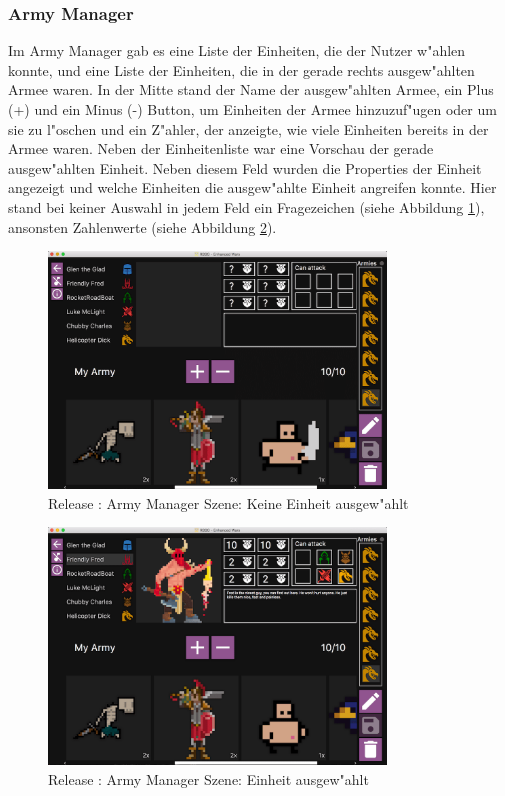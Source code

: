 \documentclass[12pt, titlepage]{scrartcl}
\newcommand{\RN}[1]{%
	\textup{\uppercase\expandafter{\romannumeral#1}}%
}
\begin{document}
		    \subsubsection{Army Manager}
		        Im Army Manager gab es eine Liste der Einheiten, die der Nutzer w"ahlen konnte, und eine Liste der Einheiten, die in der gerade rechts ausgew"ahlten Armee waren. In der Mitte stand der Name der ausgew"ahlten Armee, ein Plus (+) und ein Minus (-) Button, um Einheiten der Armee hinzuzuf"ugen oder um sie zu l"oschen und ein Z"ahler, der anzeigte, wie viele Einheiten bereits in der Armee waren. Neben der Einheitenliste war eine Vorschau der gerade ausgew"ahlten Einheit. Neben diesem Feld wurden die Properties der Einheit angezeigt und welche Einheiten die ausgew"ahlte Einheit angreifen konnte. Hier stand bei keiner Auswahl in jedem Feld ein Fragezeichen (siehe Abbildung \ref{Army_Manager_No_Unit_Selected}), ansonsten Zahlenwerte (siehe Abbildung \ref{Army_Manager_Unit_Selected}). \\
		        \begin{figure}[H] 
    				\centering
    				\includegraphics[width=0.8\textwidth]{images/old_state/army_manager/NoUnitSelected.png}
    				\caption{Release \RN{2}: Army Manager Szene: Keine Einheit ausgew"ahlt}
    				\label{Army_Manager_No_Unit_Selected}
			    \end{figure}
			    \begin{figure}[H] 
    				\centering
    				\includegraphics[width=0.8\textwidth]{images/old_state/army_manager/UnitSelected.png}
    				\caption{Release \RN{2}: Army Manager Szene: Einheit ausgew"ahlt}
    				\label{Army_Manager_Unit_Selected}
			    \end{figure}
\end{document}
